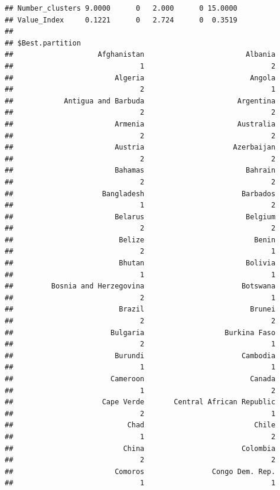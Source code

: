 \documentclass[
]{article}
\begin{document}
\begin{verbatim}
## Number_clusters 9.0000      0   2.000      0 15.0000
## Value_Index     0.1221      0   2.724      0  0.3519
## 
## $Best.partition
##                    Afghanistan                        Albania 
##                              1                              2 
##                        Algeria                         Angola 
##                              2                              1 
##            Antigua and Barbuda                      Argentina 
##                              2                              2 
##                        Armenia                      Australia 
##                              2                              2 
##                        Austria                     Azerbaijan 
##                              2                              2 
##                        Bahamas                        Bahrain 
##                              2                              2 
##                     Bangladesh                       Barbados 
##                              1                              2 
##                        Belarus                        Belgium 
##                              2                              2 
##                         Belize                          Benin 
##                              2                              1 
##                         Bhutan                        Bolivia 
##                              1                              1 
##         Bosnia and Herzegovina                       Botswana 
##                              2                              1 
##                         Brazil                         Brunei 
##                              2                              2 
##                       Bulgaria                   Burkina Faso 
##                              2                              1 
##                        Burundi                       Cambodia 
##                              1                              1 
##                       Cameroon                         Canada 
##                              1                              2 
##                     Cape Verde       Central African Republic 
##                              2                              1 
##                           Chad                          Chile 
##                              1                              2 
##                          China                       Colombia 
##                              2                              2 
##                        Comoros                Congo Dem. Rep. 
##                              1                              1 

\end{verbatim}
\end{document}
